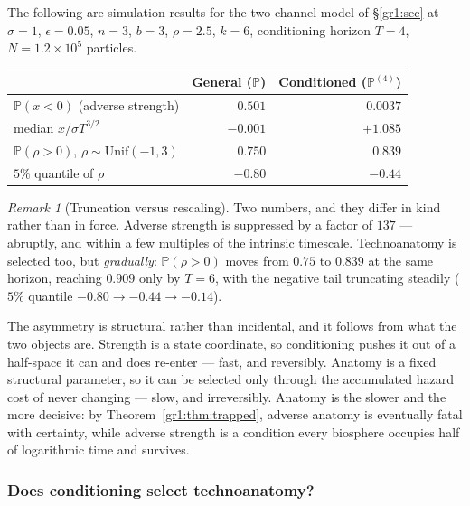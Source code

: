 \documentclass[11pt]{article}
\numberwithin{equation}{section}
\theoremstyle{plain}
\theoremstyle{definition}
\theoremstyle{remark}
\newtheorem{remark}[theorem]{Remark}
\newcommand{\PP}{\mathbb{P}}
\begin{document}
The following are simulation results for the two-channel model of
\S\ref{gr1:sec} at $\sigma=1$, $\epsilon=0.05$, $n=3$, $b=3$, $\rho=2.5$,
$k=6$, conditioning horizon $T=4$, $N=1.2\times10^{5}$ particles.

\begin{center}\small
\begin{tabular}{@{}lrr@{}}
\toprule
& General ($\PP$) & Conditioned ($\PP^{(4)}$)\\
\midrule
$\PP(x<0)$ (adverse strength) & $0.501$ & $0.0037$\\
median $x/\sigma T^{3/2}$ & $-0.001$ & $+1.085$\\
$\PP(\rho>0)$, $\rho\sim\mathrm{Unif}(-1,3)$ & $0.750$ & $0.839$\\
$5\%$ quantile of $\rho$ & $-0.80$ & $-0.44$\\
\bottomrule
\end{tabular}
\end{center}

\begin{remark}[Truncation versus rescaling]\label{gr:rem:truncresc}
Two numbers, and they differ in kind rather than in force.
Adverse strength is suppressed by a factor of $137$ --- abruptly, and
within a few multiples of the intrinsic timescale. Technoanatomy is
selected too, but \emph{gradually}: $\PP(\rho>0)$ moves from $0.75$ to
$0.839$ at the same horizon, reaching $0.909$ only by $T=6$, with the
negative tail truncating steadily ($5\%$ quantile $-0.80\to-0.44\to
-0.14$).

The asymmetry is structural rather than incidental, and it follows from
what the two objects are. Strength is a state coordinate, so
conditioning pushes it out of a half-space it can and does re-enter ---
fast, and reversibly. Anatomy is a fixed structural parameter, so it can
be selected only through the accumulated hazard cost of never changing
--- slow, and irreversibly. Anatomy is the slower and the more decisive:
by Theorem~\ref{gr1:thm:trapped}, adverse anatomy is eventually fatal
with certainty, while adverse strength is a condition every biosphere
occupies half of logarithmic time and survives.


\end{remark}

\subsubsection{Does conditioning select technoanatomy?}
\label{gr:subsub:anatsel}
\end{document}
